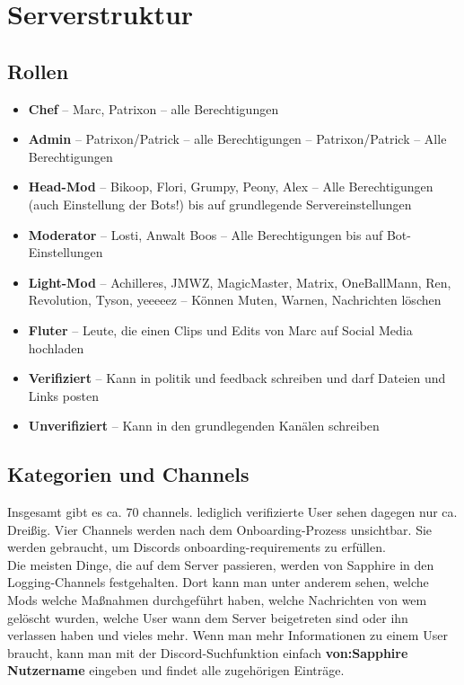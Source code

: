 \documentclass[a4paper,12pt]{article}
\begin{document}
\section{Serverstruktur}
\label{sec:serverstruktur}
\subsection{Rollen}
\begin{itemize}
    \item \textbf{Chef}
     -- Marc, Patrixon
     -- alle Berechtigungen
    \item \textbf{Admin} -- Patrixon/Patrick -- alle Berechtigungen
     -- Patrixon/Patrick
     -- Alle Berechtigungen 
    \item \textbf{Head-Mod}
     -- Bikoop, Flori, Grumpy, Peony, Alex
     -- Alle Berechtigungen (auch Einstellung der Bots!) bis auf grundlegende Servereinstellungen
    \item \textbf{Moderator}
     -- Losti, Anwalt Boos
     -- Alle Berechtigungen bis auf Bot-Einstellungen
    \item \textbf{Light-Mod}
     -- Achilleres, JMWZ, MagicMaster, Matrix, OneBallMann, Ren, Revolution, Tyson, yeeeeez
     -- Können Muten, Warnen, Nachrichten löschen
    \item \textbf{Fluter} -- Leute, die einen Clips und Edits von Marc auf Social Media hochladen
    \item \textbf{Verifiziert} -- Kann in politik und feedback schreiben und darf Dateien und Links posten
    \item \textbf{Unverifiziert} -- Kann in den grundlegenden Kanälen schreiben
\end{itemize}
\subsection{Kategorien und Channels}
Insgesamt gibt es ca. 70 channels. lediglich verifizierte User sehen dagegen nur ca. Dreißig. Vier Channels werden nach dem Onboarding-Prozess unsichtbar. Sie werden gebraucht, um Discords
onboarding-requirements zu erfüllen.\\
Die meisten Dinge, die auf dem Server passieren, werden von Sapphire in den Logging-Channels festgehalten. Dort kann man unter anderem sehen, welche Mods
welche Maßnahmen durchgeführt haben, welche Nachrichten von wem gelöscht wurden, welche User wann dem Server beigetreten sind oder ihn verlassen haben und vieles mehr.
Wenn man mehr Informationen zu einem User braucht, kann man mit der Discord-Suchfunktion einfach \textbf{von:Sapphire Nutzername} eingeben und findet alle zugehörigen Einträge.\\
\end{document}
